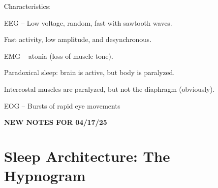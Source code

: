 \begin{coloredlist}
\begin{coloredlist}
        \item Characteristics:
        \begin{coloredlist}
            \item EEG -- Low voltage, random, fast with sawtooth waves.
            \item Fast activity, low amplitude, and desynchronous.
            \item EMG -- atonia (loss of muscle tone).
            \item Paradoxical sleep: brain is active, but body is paralyzed.
            \item Intercostal muscles are paralyzed, but not the diaphragm (obviously).
            \item EOG -- Bursts of rapid eye movements
        \end{coloredlist}
    \end{coloredlist}
\end{coloredlist}

\begin{center}
    \textbf{NEW NOTES FOR 04/17/25} \\
    \hrulefill
\end{center}

\section{Sleep Architecture: The Hypnogram}

